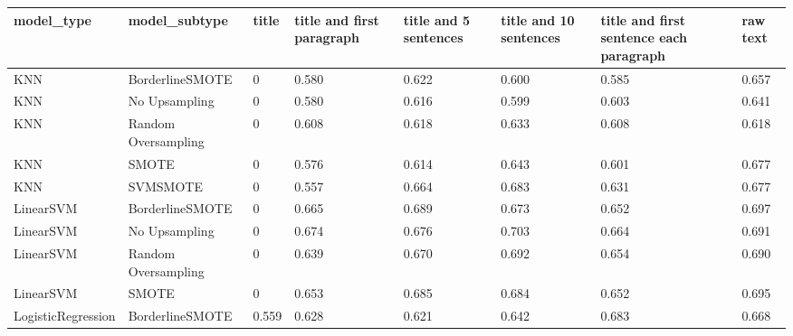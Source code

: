 \begin{tabular}{llllllll}
\toprule
                  model\_type &       model\_subtype & title & title and first paragraph & title and 5 sentences & title and 10 sentences & title and first sentence each paragraph &  raw text \\
\midrule
                         KNN &     BorderlineSMOTE &     0 &                     0.580 &                 0.622 &                  0.600 &                                   0.585 &     0.657 \\
                         KNN &       No Upsampling &     0 &                     0.580 &                 0.616 &                  0.599 &                                   0.603 &     0.641 \\
                         KNN & Random Oversampling &     0 &                     0.608 &                 0.618 &                  0.633 &                                   0.608 &     0.618 \\
                         KNN &               SMOTE &     0 &                     0.576 &                 0.614 &                  0.643 &                                   0.601 &     0.677 \\
                         KNN &            SVMSMOTE &     0 &                     0.557 &                 0.664 &                  0.683 &                                   0.631 &     0.677 \\
                   LinearSVM &     BorderlineSMOTE &     0 &                     0.665 &                 0.689 &                  0.673 &                                   0.652 &     0.697 \\
                   LinearSVM &       No Upsampling &     0 &                     0.674 &                 0.676 &                  0.703 &                                   0.664 &     0.691 \\
                   LinearSVM & Random Oversampling &     0 &                     0.639 &                 0.670 &                  0.692 &                                   0.654 &     0.690 \\
                   LinearSVM &               SMOTE &     0 &                     0.653 &                 0.685 &                  0.684 &                                   0.652 &     0.695 \\
          LogisticRegression &     BorderlineSMOTE & 0.559 &                     0.628 &                 0.621 &                  0.642 &                                   0.683 &     0.668 \\

\end{tabular}
